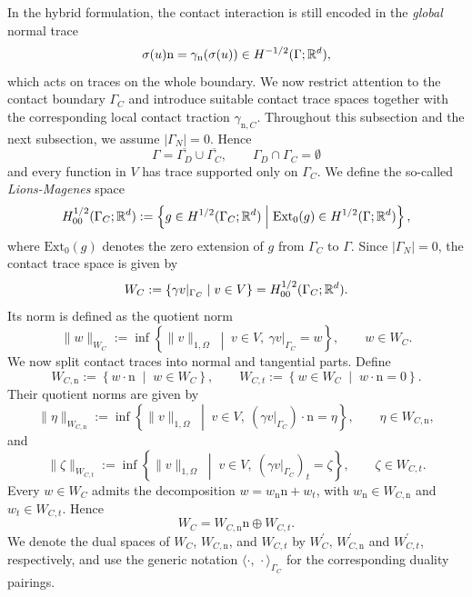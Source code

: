 In the hybrid formulation, the contact interaction is still encoded in the {\em global} normal trace
\begin{equation*}
	\sigma(u)\mathrm{n} = \gamma_{\mathrm n}(\sigma(u)) \in H^{-1/2}(\Gamma;{\mathbb R}^d),
\end{equation*}
which acts on traces on the whole boundary. We now restrict attention to the contact boundary $\Gamma_C$ and introduce suitable contact trace spaces together with the corresponding local contact traction $\gamma_{\mathrm{n},C}$. Throughout this subsection and the next subsection, we assume $|\Gamma_N| = 0$. Hence
\begin{equation*}
	\Gamma = \overline{\Gamma_D}\cup\overline{\Gamma_C},\qquad \Gamma_D\cap\Gamma_C = \emptyset
\end{equation*}
and every function in $V$ has trace supported only on $\Gamma_C$. We define the so-called {\em Lions-Magenes} space
\begin{equation*}
	H^{1/2}_{00}(\Gamma_C;{\mathbb R}^d)
	:=
	\left\{
	g\in H^{1/2}(\Gamma_C;{\mathbb R}^d)
	\;\middle|\;
	\mathrm{Ext}_0(g)\in H^{1/2}(\Gamma;{\mathbb R}^d)
	\right\},
\end{equation*}
where $\mathrm{Ext}_0(g)$ denotes the zero extension of $g$ from $\Gamma_C$ to $\Gamma$. Since $|\Gamma_N|=0$, the contact trace space is given by
\begin{equation*}
	W_C
	:=
	\left\{
	\gamma v|_{\Gamma_C}
	\;\middle|\;
	v\in V
	\right\}
	=
	H^{1/2}_{00}(\Gamma_C;{\mathbb R}^d).
\end{equation*}
Its norm is defined as the quotient norm
\begin{equation*}
	\|w\|_{W_C}
	:=
	\inf\left\{
	\|v\|_{1,\Omega}
	\;\middle|\;
	v\in V,\ \gamma v|_{\Gamma_C}=w
	\right\},
	\qquad w\in W_C.
\end{equation*}
We now split contact traces into normal and tangential parts. Define
\begin{equation*}
	W_{C,\mathrm n}
	:=
	\left\{
	w\cdot \mathrm{n}
	\;\middle|\;
	w\in W_C
	\right\},\qquad W_{C,t}
	:=
	\left\{
	w\in W_C
	\;\middle|\;
	w\cdot \mathrm{n} = 0
	\right\}.
\end{equation*}
Their quotient norms are given by
\begin{equation*}
	\|\eta\|_{W_{C,\mathrm n}}
	:=
	\inf\left\{
	\|v\|_{1,\Omega}
	\;\middle|\;
	v\in V,\ (\gamma v|_{\Gamma_C})\cdot \mathrm{n}=\eta
	\right\},
	\qquad \eta\in W_{C,\mathrm n},
\end{equation*}
and
\begin{equation*}
	\|\zeta\|_{W_{C,t}}
	:=
	\inf\left\{
	\|v\|_{1,\Omega}
	\;\middle|\;
	v\in V,\ (\gamma v|_{\Gamma_C})_t=\zeta
	\right\},
	\qquad \zeta\in W_{C,t}.
\end{equation*}
Every $w\in W_C$ admits the decomposition $w = w_{\mathrm n} \mathrm{n} + w_t$, with $w_{\mathrm n}\in W_{C,\mathrm n}$ and $w_t\in W_{C,t}$. Hence
\begin{equation*}
	W_C = W_{C,\mathrm n} \mathrm{n} \oplus W_{C,t}.
\end{equation*}
We denote the dual spaces of $W_C$, $W_{C,\mathrm n}$, and $W_{C,t}$ by $W_C^\prime,\, W_{C,\mathrm{n}}^\prime$ and $W_{C,t}^\prime$, respectively, and use the generic notation $\langle \cdot,\,\cdot\rangle_{\Gamma_C}$ for the corresponding duality pairings.

